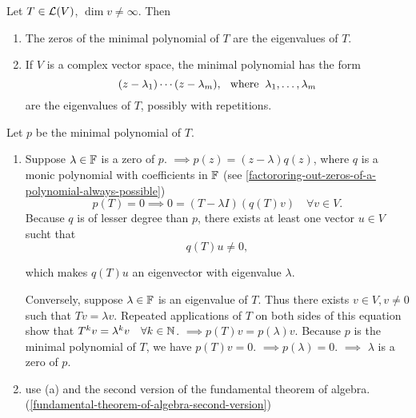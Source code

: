 \setcounter{thm}{26}
\begin{thm} 
  \label{thm: eigenvalues are the zeros of the minimal polynomial}
  Let $T \in \mathcal{L}(V)$, $\dim v \neq \infty$. Then
  \begin{enumerate}[label=\textbf{(\alph*)}]
    \item The zeros of the minimal polynomial of $T$ are the eigenvalues of $T$.
    \item If $V$ is a complex vector space, the minimal polynomial has the form
    \begin{equation}
      (z-\lambda_1)\cdots(z-\lambda_m), \;\;\, \text{where}\;\; \lambda_1, \dots, \lambda_m
    \end{equation} are the eigenvalues of $T$, possibly with repetitions.
  \end{enumerate}
\end{thm}
\begin{prf} Let $p$ be the minimal polynomial of $T$.
  \begin{enumerate}[label=\textbf{(\alph*)}]
    \item \Rightarrowdirection Suppose $\lambda \in \mathbb{F}$ is a zero of $p$. $\implies p(z)=(z-\lambda)q(z)$, where $q$ is a monic polynomial with coefficients in $\mathbb{F}$ (see \ref{factororing-out-zeros-of-a-polynomial-always-possible})
    \begin{equation}
      p(T)=0\implies 0=(T-\lambda I)(q(T)v) \quad \forall v\in V.
    \end{equation}
    Because $q$ is of lesser degree than $p$, there exists at least one vector $u\in V$ sucht that
    \begin{equation}
      q(T)u \neq 0,
    \end{equation}

    which makes $q(T)u$ an eigenvector with eigenvalue $\lambda$.

    \Leftarrowdirection Conversely, suppose $\lambda \in \mathbb{F}$ is an eigenvalue of $T$. Thus there exists $v\in V, v \neq 0$ such that $Tv=\lambda v$. Repeated applications of $T$ on both sides of this equation show that $T^kv =\lambda^k v \quad \forall k\in \mathbb{N}$.
    $\implies p(T)v=p(\lambda)v$. Because $p$ is the minimal polynomial of $T$, we have $p(T)v=0$. $\implies p(\lambda) = 0$. $\implies$ $\lambda$ is a zero of $p$.

    \item use (a) and the second version of the fundamental theorem of algebra. (\ref{fundamental-theorem-of-algebra-second-version})
  \end{enumerate}
  \vspace*{-\baselineskip}
\end{prf}

